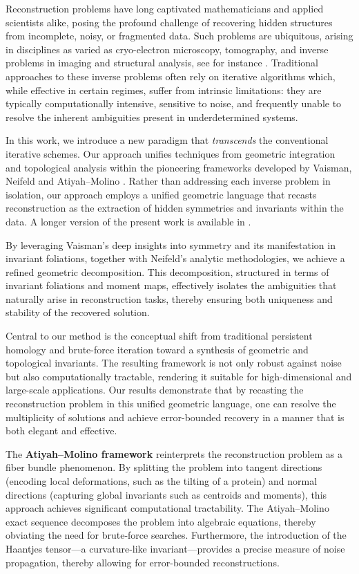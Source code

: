 \documentclass[runningheads]{llncs}
\begin{document}
Reconstruction problems have long captivated mathematicians and applied scientists alike, posing the profound challenge of recovering hidden structures from incomplete, noisy, or fragmented data. Such problems are ubiquitous, arising in disciplines as varied as cryo-electron microscopy, tomography, and inverse problems in imaging and structural analysis, see for instance \cite{CSSS,D,DGH}. Traditional approaches to these inverse problems often rely on iterative algorithms which, while effective in certain regimes, suffer from intrinsic limitations: they are typically computationally intensive, sensitive to noise, and frequently unable to resolve the inherent ambiguities present in underdetermined systems.

In this work, we introduce a new paradigm that {\it transcends} the conventional iterative schemes. Our approach unifies techniques from geometric integration and topological analysis within the pioneering frameworks developed by Vaisman\cite{V}, Neifeld \cite{N} and Atiyah--Molino \cite{A,M}. Rather than addressing each inverse problem in isolation, our approach employs a unified geometric language that recasts reconstruction as the extraction of hidden symmetries and invariants within the data. A longer version of the present work is available in \cite{CH}.
 
 By leveraging Vaisman’s deep insights into symmetry and its manifestation in invariant foliations, together with Neifeld’s analytic methodologies, we achieve a refined geometric decomposition. This decomposition, structured in terms of invariant foliations and moment maps, effectively isolates the ambiguities that naturally arise in reconstruction tasks, thereby ensuring both uniqueness and stability of the recovered solution.

Central to our method is the conceptual shift from traditional persistent homology and brute-force iteration toward a synthesis of geometric and topological invariants. The resulting framework is not only robust against noise but also computationally tractable, rendering it suitable for high-dimensional and large-scale applications. Our results demonstrate that by recasting the reconstruction problem in this unified geometric language, one can resolve the multiplicity of solutions and achieve error-bounded recovery in a manner that is both elegant and effective.

The {\bf Atiyah--Molino framework} reinterprets the reconstruction problem as a fiber bundle phenomenon. By splitting the problem into tangent directions (encoding local deformations, such as the tilting of a protein) and normal directions (capturing global invariants such as centroids and moments), this approach achieves significant computational tractability. The Atiyah--Molino exact sequence decomposes the problem into algebraic equations, thereby obviating the need for brute-force searches. Furthermore, the introduction of the Haantjes tensor---a curvature-like invariant---provides a precise measure of noise propagation, thereby allowing for error-bounded reconstructions.
\end{document}

